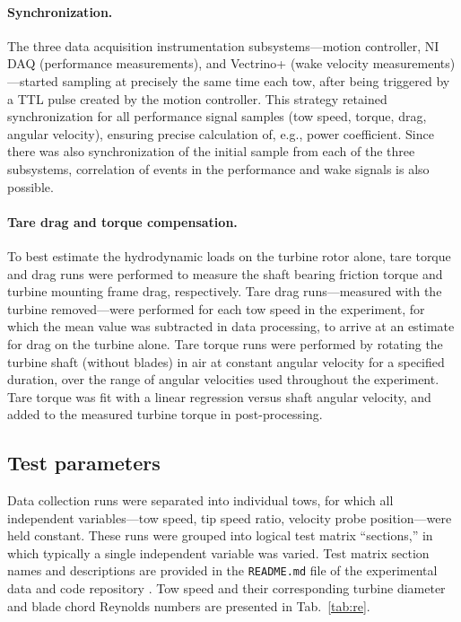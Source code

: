 \documentclass[10pt,letterpaper]{article}
\begin{document}
\paragraph{Synchronization.} The three data acquisition instrumentation
subsystems---motion controller, NI DAQ (performance measurements), and Vectrino+
(wake velocity measurements)---started sampling at precisely the same time each
tow, after being triggered by a TTL pulse created by the motion controller. This
strategy retained synchronization for all performance signal samples (tow speed,
torque, drag, angular velocity), ensuring precise calculation of, e.g., power
coefficient. Since there was also synchronization of the initial sample from
each of the three subsystems, correlation of events in the performance and wake
signals is also possible.

\paragraph{Tare drag and torque compensation.} To best estimate the hydrodynamic
loads on the turbine rotor alone, tare torque and drag runs were performed to
measure the shaft bearing friction torque and turbine mounting frame drag,
respectively. Tare drag runs---measured with the turbine removed---were
performed for each tow speed in the experiment, for which the mean value was
subtracted in data processing, to arrive at an estimate for drag on the turbine
alone. Tare torque runs were performed by rotating the turbine shaft (without
blades) in air at constant angular velocity for a specified duration, over the
range of angular velocities used throughout the experiment. Tare torque was fit
with a linear regression versus shaft angular velocity, and added to the
measured turbine torque in post-processing.


\subsection*{Test parameters}

Data collection runs were separated into individual tows, for which all
independent variables---tow speed, tip speed ratio, velocity probe
position---were held constant. These runs were grouped into logical test matrix
``sections,'' in which typically a single independent variable was varied. Test
matrix section names and descriptions are provided in the \texttt{README.md}
file of the experimental data and code repository \cite{Bachant2015-RM2-data}.
Tow speed and their corresponding turbine diameter and blade chord Reynolds
numbers are presented in Tab.~\ref{tab:re}.
\end{document}
